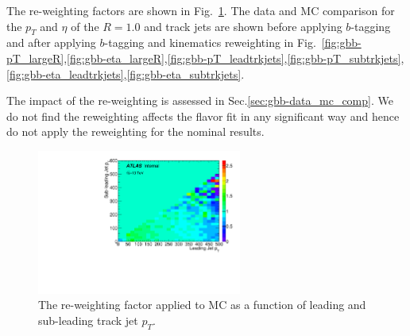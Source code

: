 The re-weighting factors are shown in Fig.~\ref{fig:gbb-reweightmap}. The data and MC comparison for the $p_{T}$ and $\eta$ of the $R=1.0$ and track jets are shown before applying $b$-tagging and after applying $b$-tagging and kinematics reweighting in Fig.~\ref{fig:gbb-pT_largeR},\ref{fig:gbb-eta_largeR},\ref{fig:gbb-pT_leadtrkjets},\ref{fig:gbb-pT_subtrkjets},\ref{fig:gbb-eta_leadtrkjets},\ref{fig:gbb-eta_subtrkjets}.

The impact of the re-weighting is assessed in Sec.\ref{sec:gbb-data_mc_comp}. We do not find the reweighting affects the flavor fit in any significant way and hence do not apply the reweighting for the nominal results.

\begin{figure}[htbp]
  \centering
 \includegraphics[width=0.6\textwidth]{figures/gbb/pTReweightMap.pdf}
\caption{The re-weighting factor applied to MC as a function of leading and sub-leading track jet $p_T$.}
  \label{fig:gbb-reweightmap}
\end{figure}


